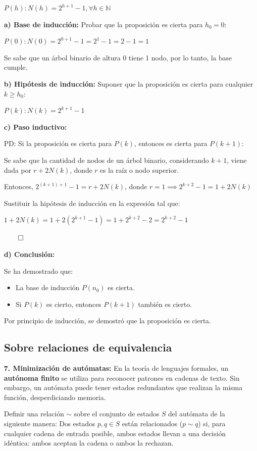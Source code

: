 \documentclass{article}
\begin{document}
$P(h): N(h) = 2^{h + 1} - 1, \forall h \in \mathbb{N}$

\textbf{a) Base de inducción:} Probar que la proposición es cierta para $h_0 = 0$:

$P(0): N(0) = 2^{0 + 1} - 1 = 2^1 - 1 = 2 - 1 = 1$

Se sabe que un árbol binario de altura $0$ tiene 1 nodo, por lo tanto, la base cumple.

\textbf{b) Hipótesis de inducción:} Suponer que la proposición es cierta para cualquier $k \ge h_0$:

$P(k): N(k) = 2^{k + 1} - 1$

\textbf{c) Paso inductivo:}

PD: Si la proposición es cierta para $P(k)$, entonces es cierta para $P(k + 1)$:

Se sabe que la cantidad de nodos de un árbol binario, considerando $k + 1$, viene dada por $r + 2N(k)$, donde $r$ es la raíz o nodo superior.

Entonces, $2^{(k + 1) + 1} - 1 = r + 2N(k)$, donde $r = 1 \implies 2^{k + 2} - 1 = 1 + 2N(k)$

Sustituir la hipótesis de inducción en la expresión tal que:

$1 + 2N(k) = 1 + 2(2^{k + 1} - 1) = 1 + 2^{k + 2} - 2 = 2^{k + 2} - 1$

$\qed$

\textbf{d) Conclusión:}

Se ha demostrado que:

\begin{itemize}
    \item La base de inducción $P(n_0)$ es cierta.
    \item Si $P(k)$ es cierto, entonces $P(k + 1)$ también es cierto.
\end{itemize}

Por principio de inducción, se demostró que la proposición es cierta.

\subsection{Sobre relaciones de equivalencia}

\textbf{7. Minimización de autómatas:} En la teoría de lenguajes formales, un \textbf{autónoma finito} se utiliza para reconocer patrones en cadenas de texto. Sin embargo, un autómata puede tener estados redundantes que realizan la misma función, desperdiciando memoria.  

Definir una relación $\sim$ sobre el conjunto de estados $S$ del autómata de la siguiente manera: Dos estados $p, q \in S$ están relacionados ($p \sim q$) si, para cualquier cadena de entrada posible, ambos estados llevan a una decisión idéntica: ambos aceptan la cadena o ambos la rechazan.  
\end{document}
